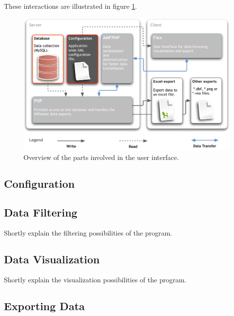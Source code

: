 These interactions are illustrated in figure \ref{fig:app_design_miceminer}.

\begin{figure}[htpb]
\begin{center}
  \includegraphics[width=\textwidth]{assets/pdf/application_design_miceminer.pdf}
  \caption[User Interface overview]{Overview of the parts involved in the user interface.}
  \label{fig:app_design_miceminer}
\end{center}
\end{figure}


\subsection{Configuration}
\label{subsec:miceminer_config}

\subsection{Data Filtering}
\label{subsec:datafilter}

Shortly explain the filtering possibilities of the program.

\subsection{Data Visualization}
\label{subsec:datavis}

Shortly explain the visualization possibilities of the program.

\subsection{Exporting Data}
\label{subsubsec:dataexp}

